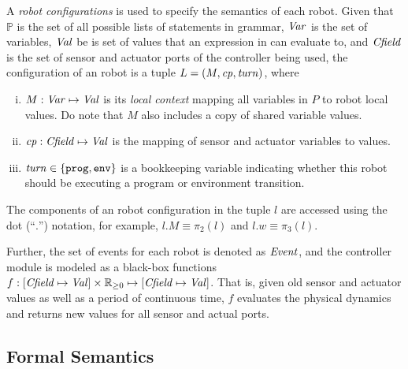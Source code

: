 A \emph{robot configurations} is used to specify the semantics of each robot.
Given that $\mathbb{P}$ is the set of all possible lists of statements in \lgname grammar,
$\mathit{Var}$ is the set of variables, $\mathit{Val}$ be is set of values that an expression in \lgname can evaluate to,
and $\mathit{Cfield}$ is the set of sensor and actuator ports of the controller being used,
the configuration of an robot is a tuple $L = ({M},\mathit{cp},\mathit{turn})$, where

\begin{enumerate}[i)]
\item ${M} : \mathit{Var} \mapsto \mathit{Val}$ is its \emph{local context} mapping all variables in $P$ to robot local values.
      Do note that $M$ also includes a copy of shared variable values.
\item $\mathit{cp} : \mathit{Cfield} \mapsto \mathit{Val}$ is the mapping of sensor and actuator variables to values.
\item $\mathit{turn} \in \{\mathtt{prog},\mathtt{env}\}$ is a bookkeeping variable indicating whether this robot should be executing a program or environment transition.
\end{enumerate}
The components of an robot configuration in the tuple $l$ are accessed
using the dot (``$.$'') notation, for example, $l.M\equiv \pi_2(l)$ and $l.w \equiv \pi_3(l)$.

Further, the set of events for each robot is denoted as $\mathit{Event}$,
and the controller module is modeled as a black-box functions
$f: [\Cfield \mapsto \Val] \times \nnreals \mapsto [\Cfield \mapsto \Val]$.
That is, given old sensor and actuator values as well as a period of continuous time,
$f$ evaluates the physical dynamics and returns new values for all sensor and actual ports.


\subsection{Formal Semantics}\label{sec:semantics}

\newcommand{\SelectEventRule}{\textsc{SelectEvent}\xspace}
\newcommand{\EndEventRule}{\textsc{EndEvent}\xspace}
\newcommand{\ProgTransRule}{\textsc{ProgTrans}\xspace}
\newcommand{\RobotEnvTransRule}{\textsc{RobotEnvTrans}\xspace}
\newcommand{\EnvTransRule}{\textsc{EnvTrans}\xspace}
\newcommand{\RobotEnvToProgRule}{\textsc{RobotEnvToProg}\xspace}
\newcommand{\EnvToProgRule}{\textsc{EnvToProg}\xspace}
\newcommand{\exprule}{\rightarrow_E\xspace}
\newcommand{\stmtrule}{\rightarrow_\mathit{stmt}\xspace}
\newcommand{\sysrule}{\rightarrow_\mathit{Env}\xspace}
\newcommand{\progtrans}{\rightarrow_\mathit{prog}\xspace}
\newcommand{\envtrans}{\rightarrow_\mathit{env}\xspace}
\newcommand{\SelectEvent}{\ensuremath{\mathtt{\oplus}}\xspace}
\newcommand{\EndEvent}{\ensuremath{\mathtt{\cdot}}\xspace}

